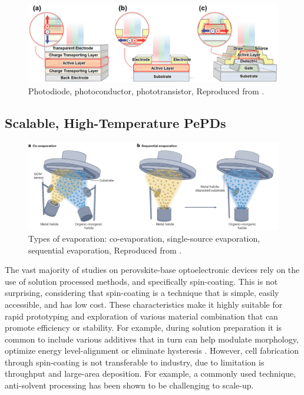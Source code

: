\begin{figure}
  \centering
  \medskip
  \includegraphics[width=.9\textwidth]{chapters/introduction/image/types_of_detector.jpg}
  \caption[Short caption for Table of Figures]{Photodiode, photoconductor, phototransistor, Reproduced from \cite{Yoo2021ADirections}.}
  \label{fig:ch2:types_of_detector}
\end{figure}

\subsection{Scalable, High-Temperature PePDs}

\begin{figure}
  \centering
  \medskip
  \includegraphics[width=.99\textwidth]{chapters/introduction/image/types_of_evaporation.png}
  \caption[Short caption for Table of Figures]{Types of evaporation: co-evaporation, single-source evaporation, sequential evaporation, Reproduced from \cite{Han2025PerovskiteCells}.}
  \label{fig:ch2:types_of_evaporation}
\end{figure}

The vast majority of studies on perovskite-base optoelectronic devices rely on the use of solution processed methods, and specifically spin-coating. This is not surprising, considering that spin-coating is a technique that is simple, easily accessible, and has low cost. These characteristics make it highly suitable for rapid prototyping and exploration of various material combination that can promote efficiency or stability. For example, during solution preparation it is common to include various additives that in turn can help modulate morphology, optimize energy level-alignment or eliminate hysteresis \cite{Liu2020ACells}. However, cell fabrication through spin-coating is not transferable to industry, due to limitation is throughput and large-area deposition. For example, a commonly used technique, anti-solvent processing has been shown to be challenging to scale-up\cite{Saki2021Solution-processedCells}.

